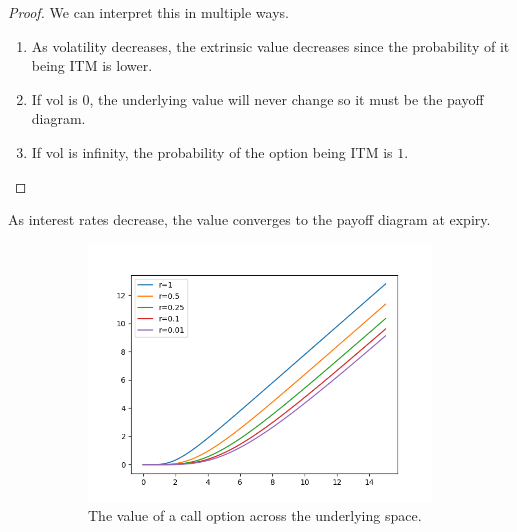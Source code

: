 \documentclass{article}
\begin{document}
    \begin{proof}
      We can interpret this in multiple ways. 
      \begin{enumerate}
        \item As volatility decreases, the extrinsic value decreases since the probability of it being ITM is lower. 
        \item If vol is $0$, the underlying value will never change so it must be the payoff diagram. 
        \item If vol is infinity, the probability of the option being ITM is $1$. 
      \end{enumerate}
    \end{proof}

    \begin{theorem}
      As interest rates decrease, the value converges to the payoff diagram at expiry.
      \begin{figure}[H]
        \centering
        \begin{subfigure}[b]{0.48\textwidth}
        \centering
          \includegraphics[width=\textwidth]{img/bs_call_wrt_r.png}
          \caption{The value of a call option across the underlying space. }
          \label{fig:bs_call_wrt_r}
        \end{subfigure}
        \hfill 
        \begin{subfigure}[b]{0.48\textwidth}
        \centering

\end{subfigure}
\end{figure}
\end{theorem}
\end{document}
